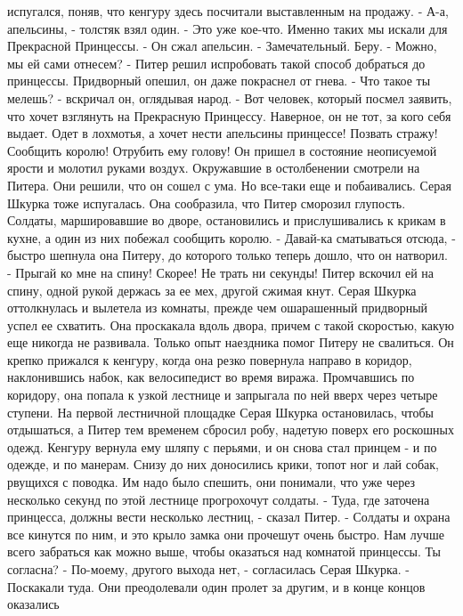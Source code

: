 испугался, поняв, что кенгуру здесь посчитали выставленным на продажу.
    - А-а, апельсины, - толстяк взял один. - Это уже кое-что. Именно 
таких мы искали для Прекрасной Принцессы. - Он сжал апельсин. - 
Замечательный. Беру.
    - Можно, мы ей сами отнесем? - Питер решил испробовать такой 
способ добраться до принцессы.
    Придворный опешил, он даже покраснел от гнева.
    - Что такое ты мелешь? - вскричал он, оглядывая народ. - Вот 
человек, который посмел заявить, что хочет взглянуть на Прекрасную 
Принцессу. Наверное, он не тот, за кого себя выдает. Одет в лохмотья, 
а хочет нести апельсины принцессе! Позвать стражу! Сообщить королю! 
Отрубить ему голову!
    Он пришел в состояние неописуемой ярости и молотил руками воздух. 
Окружавшие в остолбенении смотрели на Питера. Они решили, что он сошел 
с ума. Но все-таки еще и побаивались.
    Серая Шкурка тоже испугалась. Она сообразила, что Питер сморозил 
глупость. Солдаты, маршировавшие во дворе, остановились и 
прислушивались к крикам в кухне, а один из них побежал сообщить 
королю.
    - Давай-ка сматываться отсюда, - быстро шепнула она Питеру, до 
которого только теперь дошло, что он натворил. - Прыгай ко мне на 
спину! Скорее! Не трать ни секунды!
    Питер вскочил ей на спину, одной рукой держась за ее мех, другой 
сжимая кнут. Серая Шкурка оттолкнулась и вылетела из комнаты, прежде 
чем ошарашенный придворный успел ее схватить.
    Она проскакала вдоль двора, причем с такой скоростью, какую еще 
никогда не развивала. Только опыт наездника помог Питеру не свалиться. 
Он крепко прижался к кенгуру, когда она резко повернула направо в 
коридор, наклонившись набок, как велосипедист во время виража. 
Промчавшись по коридору, она попала к узкой лестнице и запрыгала по 
ней вверх через четыре ступени.
    На первой лестничной площадке Серая Шкурка остановилась, чтобы 
отдышаться, а Питер тем временем сбросил робу, надетую поверх его 
роскошных одежд. Кенгуру вернула ему шляпу с перьями, и он снова стал 
принцем - и по одежде, и по манерам.
    Снизу до них доносились крики, топот ног и лай собак, рвущихся с 
поводка. Им надо было спешить, они понимали, что уже через несколько 
секунд по этой лестнице прогрохочут солдаты.
    - Туда, где заточена принцесса, должны вести несколько лестниц, - 
сказал Питер. - Солдаты и охрана все кинутся по ним, и это крыло замка 
они прочешут очень быстро. Нам лучше всего забраться как можно выше, 
чтобы оказаться над комнатой принцессы. Ты согласна?
    - По-моему, другого выхода нет, - согласилась Серая Шкурка. - 
Поскакали туда.
    Они преодолевали один пролет за другим, и в конце концов оказались 
